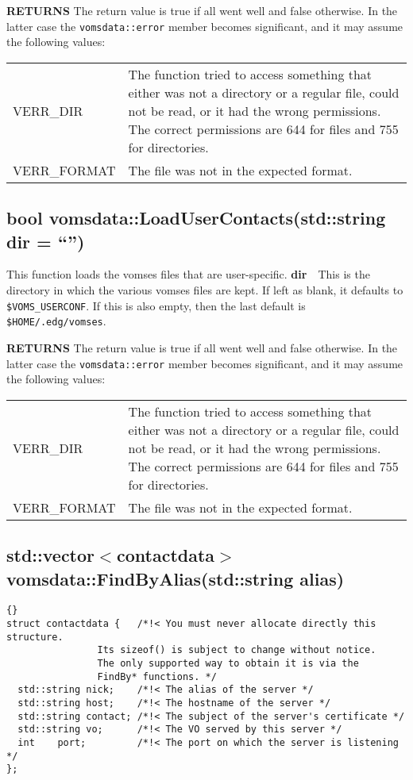 \documentclass[a4paper]{book}
\newcommand{\return}{\textbf{RETURNS}\newline}
\newcommand{\parameter}[2]{\newline\textbf{#1}\ \ #2}
\begin{document}
\return
The return value is true if all went well and false otherwise.  In the
latter case the \texttt{vomsdata::error} member becomes significant,
and it may assume the following values:

\bigskip\begin{tabular}{lp{3in}}
VERR\_DIR & The function tried to access something that either was not
a directory or a regular file, could not be read, or it had the wrong
permissions.  The correct permissions are 644 for files and 755 for
directories.\\
VERR\_FORMAT & The file was not in the expected format.
\end{tabular}

\subsection{bool vomsdata::LoadUserContacts(std::string dir = ``'')}
This function loads the vomses files that are user-specific.
\parameter{dir}{This is the directory in which the various vomses
files are kept.  If left as blank, it defaults to
\texttt{\$VOMS\_USERCONF}.  If this is also empty, then the last
default is \texttt{\$HOME/.edg/vomses}.}

\return
The return value is true if all went well and false otherwise.  In the
latter case the \verb|vomsdata::error| member becomes significant,
and it may assume the following values:

\bigskip\begin{tabular}{lp{3in}}
\color{black}VERR\_DIR & \color{black}The function tried to access
something that either was not a directory or a regular file, could not
be read, or it had the wrong permissions.  The correct permissions are
644 for files and 755 for directories.\\ 
VERR\_FORMAT & The file was not in the expected format.\\
\end{tabular}

\subsection{std::vector$<$contactdata$>$ vomsdata::FindByAlias(std::string alias)}

\begin{lstlisting}{}
struct contactdata {   /*!< You must never allocate directly this structure.
			    Its sizeof() is subject to change without notice.
			    The only supported way to obtain it is via the
			    FindBy* functions. */
  std::string nick;    /*!< The alias of the server */
  std::string host;    /*!< The hostname of the server */
  std::string contact; /*!< The subject of the server's certificate */
  std::string vo;      /*!< The VO served by this server */
  int    port;	       /*!< The port on which the server is listening */
};
\end{lstlisting}
\end{document}
